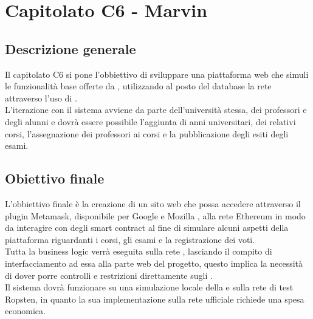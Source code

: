 \documentclass[StudioDiFattibilità.tex]{subfiles}
\begin{document}
\chapter{Capitolato C6 - Marvin}
\section{Descrizione generale}
Il capitolato C6 si pone l'obbiettivo di sviluppare una piattaforma web che simuli le funzionalità base offerte da , utilizzando al posto del database la rete  attraverso l'uso di .\\
L'iterazione con il sistema avviene da parte dell'università stessa, dei professori e degli alunni e dovrà essere possibile l'aggiunta di anni universitari, dei relativi corsi, l'assegnazione dei professori ai corsi e la pubblicazione degli esiti degli esami.
\section{Obiettivo finale}
L'obbiettivo finale è la creazione di un sito web che possa accedere attraverso il plugin Metamask, disponibile per Google  e Mozilla , alla rete Ethereum in modo da interagire con degli smart contract al fine di simulare alcuni aspetti della piattaforma  riguardanti i corsi, gli esami e la registrazione dei voti.\\
Tutta la business logic verrà eseguita sulla rete , lasciando il compito di interfacciamento ad essa alla parte web del progetto, questo implica la necessità di dover porre controlli e restrizioni direttamente sugli .\\
Il sistema dovrà funzionare su una simulazione locale della  e sulla rete di test Ropsten, in quanto la sua implementazione sulla rete ufficiale  richiede una spesa economica.
\end{document}
